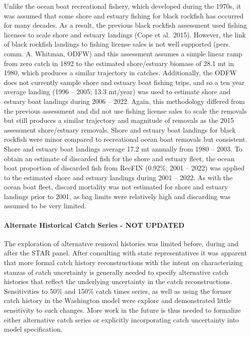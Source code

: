 \documentclass[11pt,
  english,
  letterpaper,
]{article}
\begin{document}
Unlike the ocean boat recreational fishery, which developed during the 1970s, it was assumed that some shore and estuary fishing for black rockfish has occurred for many decades. As a result, the previous black rockfish assessment used fishing licenses to scale shore and estuary landings (Cope et al.~2015). However, the link of black rockfish landings to fishing license sales is not well supported (pers. comm. A. Whitman, ODFW) and this assessment assumes a simple linear ramp from zero catch in 1892 to the estimated shore/estuary biomass of 28.1 mt in 1980, which produces a similar trajectory in catches. Additionally, the ODFW does not currently sample shore and estuary boat fishing trips, and so a ten year average landing (1996 -- 2005; 13.3 mt/year) was used to estimate shore and estuary boat landings during 2006 -- 2022. Again, this methodology differed from the previous assessment and did not use fishing license sales to scale the removals but still produces a similar trajectory and magnitude of removals as the 2015 assessment shore/estuary removals. Shore and estuary boat landings for black rockfish were minor compared to recreational ocean boat removals but consistent. Shore and estuary boat landings average 17.2 mt annually from 1980 -- 2003. To obtain an estimate of discarded fish for the shore and estuary fleet, the ocean boat proportion of discarded fish from RecFIN (0.92\%; 2001 -- 2022) was applied to the estimated shore and estuary landings during 2001 -- 2022. As with the ocean boat fleet, discard mortality was not estimated for shore and estuary landings prior to 2001, as bag limits were relatively high and discarding was assumed to be very limited.

\hypertarget{alternate-historical-catch-series---not-updated}{%
\paragraph{Alternate Historical Catch Series - NOT UPDATED}\label{alternate-historical-catch-series---not-updated}}

The exploration of alternative removal histories was limited before, during and after the STAR panel. After consulting with state representatives it was apparent that more formal catch history reconstructions with the intent on characterizing stanzas of catch uncertainty is generally needed to specify alternative catch histories that reflect the underlying uncertainty in the catch reconstructions. Sensitivities to 50\% and 150\% catch times series, as well as using the former catch history in the Washington model were explore and demonstrated little sensitivity to such changes. More work in the future is thus needed to formalize either alternative catch series or explicitly incorporating catch uncertainty into model specification.
\end{document}
